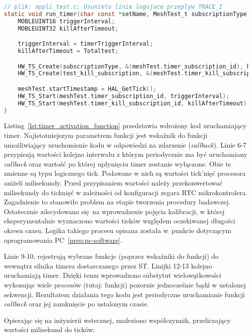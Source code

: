 \begin{lstlisting}[language=C,
    caption={Funkcja aktywująca timer},
    label={lst:timer_activation_function}]
// plik: appli_test.c; Usunieto linie logujace przeplyw TRACE_I
static void run_timer(char const *setName, MeshTest_t subscriptionType, MOBLE_ADDRESS src ,MOBLE_ADDRESS dst, void (*callback)(void) ) {
	MOBLEUINT16 triggerInterval;
	MOBLEUINT32 killAfterTimeout;

	triggerInterval = timerTriggerInterval;
	killAfterTimeout = Totaltest;

	HW_TS_Create(subscriptionType, &(meshTest.timer_subscription_id), hw_ts_Repeated, callback);
	HW_TS_Create(test_kill_subscription, &(meshTest.timer_kill_subscription_id), hw_ts_SingleShot, kill_subscription);

	meshTest.startTimestamp = HAL_GetTick();
	HW_TS_Start(meshTest.timer_subscription_id, triggerInterval);
	HW_TS_Start(meshTest.timer_kill_subscription_id, killAfterTimeout);
}
\end{lstlisting}

Listing~\ref{lst:timer_activation_function} przedstawia wdrożony kod uruchamiający timer. Najistotniejszym parametrem funkcji jest
wskaźnik do funkcji umożliwiający uruchomienie kodu w odpowiedzi na zdarzenie (\textit{callback}). Linie 6-7 przypisują
wartości kolejno interwału z którym periodycznie ma być uruchamiany \textit{callback} oraz wartość po której upłynięciu
timer zostanie wyłączone. Obie te zmienne są typu logicznego tick. Podawane w nich są wartości tick'nięć procesora aniżeli
milisekundy. Przed przypisaniem wartości należy przekonwertować milisekundy do ticknięć w zależności od konfiguracji
zegara RTC mikrokontrolera. Zagadnienie to stanowiło problem na etapie tworzenia procedury badawczej. Ostatecznie zdecydowano
się na wprowadzenie pojęcia kalibracji, w której eksperymentalnie wyznaczono wartości ticków względem oczekiwanej długości
okresu czasu. Logika takiego procesu opisana została w~punkcie dotyczącym oprogramowania PC~\ref{prep:pc-software}.

Linie 9-10, rejestrują wybrane funkcje (poprzez wskaźniki do funkcji) do wewnątrz silnika timera dostarczanego przez ST.
Linijki 12-13 kolejno uruchamiają timer. Dzięki temu wprowadzono substytut wielowątkowości wykonując wiele procesów (tutaj: funkcji)
pozornie jednocześnie bądź w ustalonej sekwencji. Rezultatem działania tego kodu jest periodyczne uruchamianie
funkcji \textit{callback} oraz jej zamknięcie po ustalonym czasie.

Opierając się na inżynierii wstecznej, znaleziono współczynnik, przeliczający wartości milisekund do ticków:

